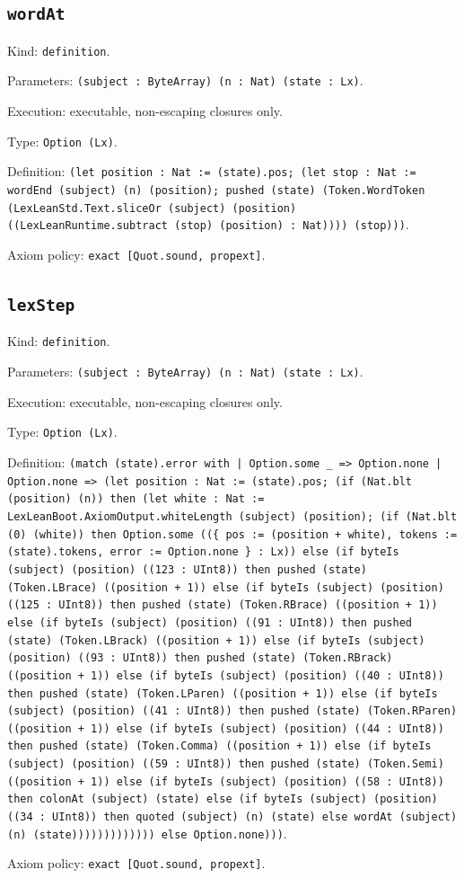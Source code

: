 \documentclass[11pt]{article}
\begin{document}
\subsection*{\texttt{wordAt}}
\noindent Kind: \texttt{definition}.\par
\noindent Parameters: \texttt{(subject : ByteArray) (n : Nat) (state : Lx)}.\par
\noindent Execution: executable, non-escaping closures only.\par
\noindent Type: \texttt{Option (Lx)}.\par
\noindent Definition: \texttt{(let position : Nat := (state).pos; (let stop : Nat := wordEnd (subject) (n) (position); pushed (state) (Token.WordToken (LexLeanStd.Text.sliceOr (subject) (position) ((LexLeanRuntime.subtract (stop) (position) : Nat)))) (stop)))}.\par
\noindent Axiom policy: \texttt{exact [Quot.sound, propext]}.\par
\subsection*{\texttt{lexStep}}
\noindent Kind: \texttt{definition}.\par
\noindent Parameters: \texttt{(subject : ByteArray) (n : Nat) (state : Lx)}.\par
\noindent Execution: executable, non-escaping closures only.\par
\noindent Type: \texttt{Option (Lx)}.\par
\noindent Definition: \texttt{(match (state).error with | Option.some \_ => Option.none | Option.none => (let position : Nat := (state).pos; (if (Nat.blt (position) (n)) then (let white : Nat := LexLeanBoot.AxiomOutput.whiteLength (subject) (position); (if (Nat.blt (0) (white)) then Option.some ((\{ pos := (position + white), tokens := (state).tokens, error := Option.none \} : Lx)) else (if byteIs (subject) (position) ((123 : UInt8)) then pushed (state) (Token.LBrace) ((position + 1)) else (if byteIs (subject) (position) ((125 : UInt8)) then pushed (state) (Token.RBrace) ((position + 1)) else (if byteIs (subject) (position) ((91 : UInt8)) then pushed (state) (Token.LBrack) ((position + 1)) else (if byteIs (subject) (position) ((93 : UInt8)) then pushed (state) (Token.RBrack) ((position + 1)) else (if byteIs (subject) (position) ((40 : UInt8)) then pushed (state) (Token.LParen) ((position + 1)) else (if byteIs (subject) (position) ((41 : UInt8)) then pushed (state) (Token.RParen) ((position + 1)) else (if byteIs (subject) (position) ((44 : UInt8)) then pushed (state) (Token.Comma) ((position + 1)) else (if byteIs (subject) (position) ((59 : UInt8)) then pushed (state) (Token.Semi) ((position + 1)) else (if byteIs (subject) (position) ((58 : UInt8)) then colonAt (subject) (state) else (if byteIs (subject) (position) ((34 : UInt8)) then quoted (subject) (n) (state) else wordAt (subject) (n) (state))))))))))))) else Option.none)))}.\par
\noindent Axiom policy: \texttt{exact [Quot.sound, propext]}.\par
\end{document}
